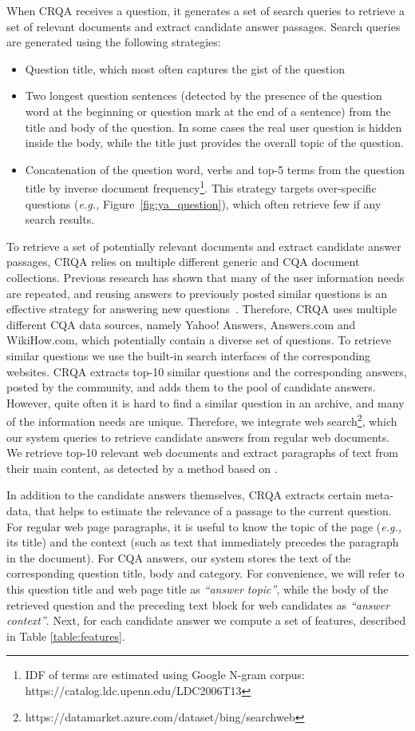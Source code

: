 \documentclass[letterpaper]{article}
\makeatletter
\newcommand{\eg}{\textit{e.g.,}\@\xspace}
\makeatother
\begin{document}
When CRQA receives a question, it generates a set of search queries to retrieve a set of relevant documents and extract candidate answer passages.
Search queries are generated using the following strategies:
\begin{itemize}
\item Question title, which most often captures the gist of the question
\item Two longest question sentences (detected by the presence of the question word at the beginning or question mark at the end of a sentence) from the title and body of the question. In some cases the real user question is hidden inside the body, while the title just provides the overall topic of the question.
\item Concatenation of the question word, verbs and top-5 terms from the question title by inverse document frequency\footnote{IDF of terms are estimated using Google N-gram corpus: https://catalog.ldc.upenn.edu/LDC2006T13}. This strategy targets over-specific questions (\eg Figure~\ref{fig:ya_question}), which often retrieve few if any search results.
\end{itemize}

To retrieve a set of potentially relevant documents and extract candidate answer passages, CRQA relies on multiple different generic and CQA document collections.
Previous research has shown that many of the user information needs are repeated, and reusing answers to previously posted similar questions is an effective strategy for answering new questions~\cite{carmel2000eresponder,shtok2012learning}.
Therefore, CRQA uses multiple different CQA data sources, namely Yahoo! Answers, Answers.com and WikiHow.com, which potentially contain a diverse set of questions.
To retrieve similar questions we use the built-in search interfaces of the corresponding websites.
CRQA extracts top-10 similar questions and the corresponding answers, posted by the community, and adds them to the pool of candidate answers.
However, quite often it is hard to find a similar question in an archive, and many of the information needs are unique.
Therefore, we integrate web search\footnote{https://datamarket.azure.com/dataset/bing/searchweb}, which our system queries to retrieve candidate answers from regular web documents.
We retrieve top-10 relevant web documents and extract paragraphs of text from their main content, as detected by a method based on \cite{Kohlschutter_2010}.

In addition to the candidate answers themselves, CRQA extracts certain meta-data, that helps to estimate the relevance of a passage to the current question.
For regular web page paragraphs, it is useful to know the topic of the page (\eg its title) and the context (such as text that immediately precedes the paragraph in the document).
For CQA answers, our system stores the text of the corresponding question title, body and category.
For convenience, we will refer to this question title and web page title as \textit{``answer topic''}, while the body of the retrieved question and the preceding text block for web candidates as \textit{``answer context''}.
Next, for each candidate answer we compute a set of features, described in Table \ref{table:features}.
\end{document}
